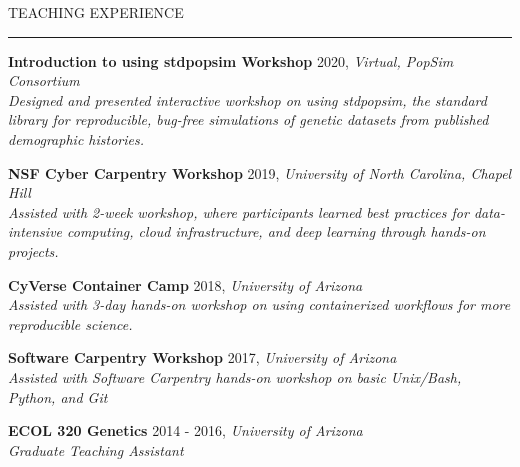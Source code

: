 \documentclass{resume} %
\renewenvironment{rSection}[1]{
\sectionskip
\textcolor{RoyalPurple}{\MakeUppercase{#1}}
\sectionlineskip
\hrule
\begin{list}{}{
\setlength{\leftmargin}{1.5em}
}
\item[]
}{
\end{list}
}
\begin{document}
\begin{rSection}{Teaching Experience}

    {\bf Introduction to using stdpopsim Workshop} \hfill 2020, {\em Virtual, PopSim Consortium} \\ 
    {\em Designed and presented interactive workshop on using stdpopsim, the standard library for reproducible, bug-free simulations of genetic datasets from published demographic histories.}

    {\bf NSF Cyber Carpentry Workshop} \hfill 2019, {\em University of North Carolina, Chapel Hill} \\ 
    {\em Assisted with 2-week workshop, where participants learned best practices for data-intensive computing, cloud infrastructure, and deep learning through hands-on projects.}

    {\bf CyVerse Container Camp} \hfill 2018, {\em University of Arizona} \\ 
    {\em Assisted with 3-day hands-on workshop on using containerized workflows for more reproducible science.}

    {\bf Software Carpentry Workshop} \hfill 2017, {\em University of Arizona} \\ 
    {\em Assisted with Software Carpentry hands-on workshop on basic Unix/Bash, Python, and Git}

    {\bf ECOL 320 Genetics} \hfill 2014 - 2016, {\em University of Arizona} \\ 
    {\em Graduate Teaching Assistant}

\end{rSection}

\end{document}

